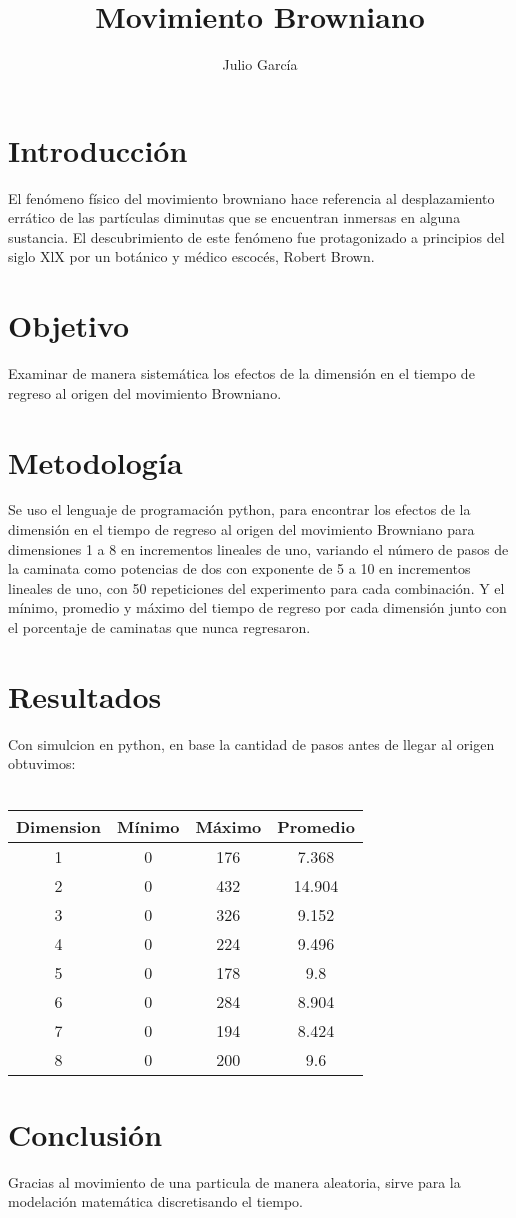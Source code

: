 \documentclass{article}
\title { Movimiento Browniano}
\author{Julio Garc\'ia}
\begin{document}
\maketitle


\section{Introducci\'on}

El fenómeno físico del movimiento browniano hace referencia al desplazamiento errático de las partículas diminutas que se encuentran inmersas en alguna sustancia. El descubrimiento de este fenómeno fue protagonizado a principios del siglo XlX por un botánico y médico escocés, Robert Brown.

\section{Objetivo}
Examinar de manera sistemática los efectos de la dimensión en el tiempo de regreso al origen del movimiento Browniano.

\section{Metodolog\'ia}
Se uso el  lenguaje de programación python, para encontrar	los efectos de la dimensión en el tiempo de regreso al origen del movimiento Browniano para dimensiones 1 a 8 en incrementos lineales de uno, variando el número de pasos de la caminata como potencias de dos con exponente de 5 a 10 en incrementos lineales de uno, con 50 repeticiones del experimento para cada combinación. Y el mínimo, promedio y máximo del tiempo de regreso por cada dimensión junto con el porcentaje de caminatas que nunca regresaron.

\newpage
\section{Resultados}
Con simulcion en python, en base  la cantidad de pasos antes de llegar al origen obtuvimos: \\ \\


\begin{tabular}{| c | c | c | c |}
	\hline
	Dimension & Mínimo & Máximo & Promedio\\ \hline
	1 & 0 & 176 & 7.368 \\
	2 & 0 & 432 & 14.904\\
	3 & 0 & 326 & 9.152\\
	4 & 0 & 224 & 9.496\\
	5 & 0 & 178 & 9.8\\
	6 & 0 & 284 & 8.904\\
	7 & 0 & 194 & 8.424\\
	8 & 0 & 200 & 9.6\\ \hline

	
\end{tabular}

\section{Conclusi\'on}
Gracias al movimiento de una particula de manera aleatoria, sirve para la modelación matemática discretisando el tiempo.



\end{document}
